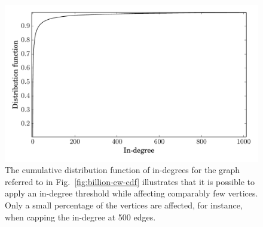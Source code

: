 \documentclass[conference]{IEEEtran}
\newcommand{\rn}[1]{\rho_{#1}}
\begin{document}
\begin{figure}
\begin{centering}
\includegraphics[width=1.0\columnwidth]{figures/billion-id-cdf.pdf}
\end{centering}
\caption{The cumulative distribution function of in-degrees for the graph referred to in Fig.\ \ref{fig:billion-ew-cdf}
 illustrates that it is possible to apply an in-degree threshold while affecting comparably few vertices. Only a small percentage
  of the vertices are affected, for instance, when capping the in-degree at 500 edges.}
\label{fig:billion-id-cdf}
\end{figure}

\end{document}
